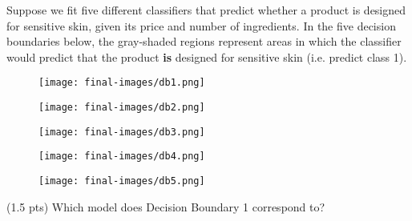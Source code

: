\documentclass[twoside,12pt]{article}
\begin{document}
\begin{probset}

    

\newpage

\begin{prob}[(6 pts)]

Suppose we fit five different classifiers that predict whether a product is designed for sensitive skin, given its price and number of ingredients. In the five decision boundaries below, the gray-shaded regions represent areas in which the classifier would predict that the product \textbf{is} designed for sensitive skin (i.e. predict class 1). 

\begin{figure}[h!]
    \centering
    \begin{minipage}{0.3\textwidth}
        \centering
        \texttt{[image: final-images/db1.png]}
    \end{minipage}%
    \hfill
    \begin{minipage}{0.3\textwidth}
        \centering
        \texttt{[image: final-images/db2.png]}
    \end{minipage}%
    \hfill
    \begin{minipage}{0.3\textwidth}
        \centering
        \texttt{[image: final-images/db3.png]}
    \end{minipage}


    \begin{minipage}{0.3\textwidth}
        \centering
        \texttt{[image: final-images/db4.png]}
    \end{minipage}%
    \begin{minipage}{0.3\textwidth}
        \centering
        \texttt{[image: final-images/db5.png]}
    \end{minipage}
\end{figure}

\begin{subprobset}

\begin{subprob}(1.5 pts) Which model does Decision Boundary 1 correspond to?

\begin{tabular}{ll}


\end{tabular}
\end{subprob}
\end{subprobset}
\end{prob}
\end{probset}
\end{document}
